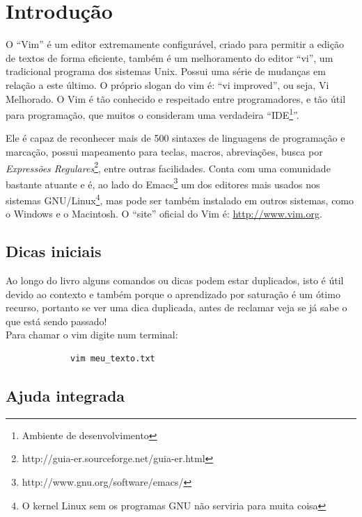 \documentclass[10pt,a4paper,openany]{book}
\begin{document}
\newpage
\tableofcontents

\chapter{Introdução}

O ``Vim'' é um editor extremamente configurável, criado para permitir a edição
de textos de forma eficiente, também é um melhoramento do editor ``vi'', um
tradicional programa dos sistemas Unix. Possui uma série de mudanças em relação
a este último. O próprio slogan do vim é: ``vi improved'', ou seja, Vi Melhorado.  O Vim é
tão conhecido e respeitado entre programadores, e tão útil para programação,
que muitos o consideram uma verdadeira ``IDE\footnote{Ambiente de
desenvolvimento}''.

Ele é capaz de reconhecer mais de 500 sintaxes de linguagens de programação e
marcação, possui mapeamento para teclas, macros, abreviações, busca por
{\em{Expressões Regulares}}\footnote{http://guia-er.sourceforge.net/guia-er.html},
entre outras facilidades. Conta com uma comunidade bastante atuante e é, ao
lado do Emacs\footnote{http://www.gnu.org/software/emacs/} um dos editores mais
usados nos sistemas GNU/Linux\footnote{O kernel Linux sem os programas GNU não serviria para muita coisa},
mas pode ser também instalado em outros sistemas,
como o Windows e o Macintosh.  O ``site'' oficial do Vim é:
\url{http://www.vim.org}.


\section{Dicas iniciais}\label{Dicas iniciais}

Ao longo do livro alguns comandos ou dicas podem estar duplicados, isto
é útil devido ao contexto e também porque o aprendizado por saturação
é um ótimo recurso, portanto se ver uma dica duplicada, antes de
reclamar veja se já sabe o que está sendo passado! \\

Para chamar o vim digite num terminal:

\begin{verbatim}
			 vim meu_texto.txt
\end{verbatim}

\section{Ajuda integrada}
\end{document}

